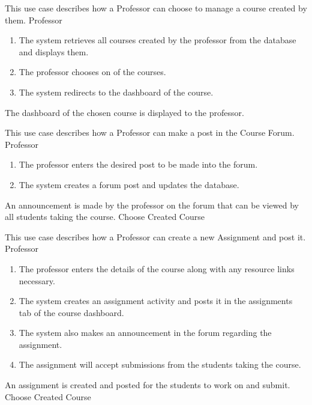 \documentclass[12pt, a4]{report}
\begin{document}

{ %
This use case describes how a Professor can choose to manage a course created by them.
}
{ %
Professor
}
{ %
\begin{enumerate}
    \item The system retrieves all courses created by the professor from the database and displays them.
    \item The professor chooses on of the courses.
    \item The system redirects to the dashboard of the course.
\end{enumerate}
}
{ %
}
{ %
}
{ %
The dashboard of the chosen course is displayed to the professor.
}
{ %
}
{ %
}


\newpage
{}
{ %
This use case describes how a Professor can make a post in the Course Forum.
}
{ %
Professor
}
{ %
\begin{enumerate}
    \item The professor enters the desired post to be made into the forum.
    \item The system creates a forum post and updates the database.
\end{enumerate}
}
{ %
}
{ %
}
{ %
An announcement is made by the professor on the forum that can be viewed by all students taking the course.
}
{ %
Choose Created Course
}
{ %
}


{ %
This use case describes how a Professor can create a new Assignment and post it.
}
{ %
Professor
}
{ %
\begin{enumerate}
    \item The professor enters the details of the course along with any resource links necessary.
    \item The system creates an assignment activity and posts it in the assignments tab of the course dashboard.
    \item The system also makes an announcement in the forum regarding the assignment.
    \item The assignment will accept submissions from the students taking the course.
\end{enumerate}
}
{ %
}
{ %
}
{ %
An assignment is created and posted for the students to work on and submit.
}
{ %
Choose Created Course
}
{ %
}
\end{document}
